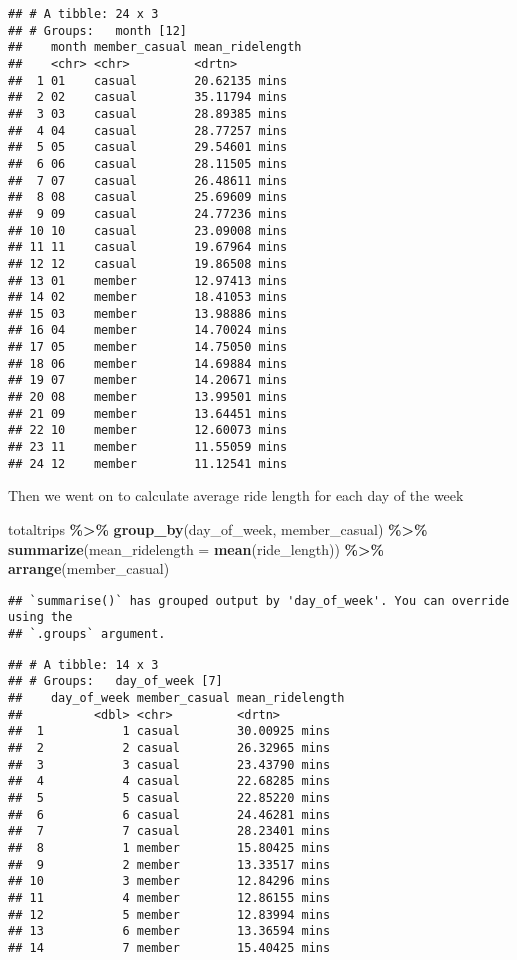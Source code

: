 \documentclass[
]{article}
\newenvironment{Shaded}{\begin{snugshade}}{\end{snugshade}}
\newcommand{\AttributeTok}[1]{\textcolor[rgb]{0.13,0.29,0.53}{#1}}
\newcommand{\FunctionTok}[1]{\textcolor[rgb]{0.13,0.29,0.53}{\textbf{#1}}}
\newcommand{\NormalTok}[1]{#1}
\newcommand{\SpecialCharTok}[1]{\textcolor[rgb]{0.81,0.36,0.00}{\textbf{#1}}}
\begin{document}
\begin{verbatim}
## # A tibble: 24 x 3
## # Groups:   month [12]
##    month member_casual mean_ridelength
##    <chr> <chr>         <drtn>         
##  1 01    casual        20.62135 mins  
##  2 02    casual        35.11794 mins  
##  3 03    casual        28.89385 mins  
##  4 04    casual        28.77257 mins  
##  5 05    casual        29.54601 mins  
##  6 06    casual        28.11505 mins  
##  7 07    casual        26.48611 mins  
##  8 08    casual        25.69609 mins  
##  9 09    casual        24.77236 mins  
## 10 10    casual        23.09008 mins  
## 11 11    casual        19.67964 mins  
## 12 12    casual        19.86508 mins  
## 13 01    member        12.97413 mins  
## 14 02    member        18.41053 mins  
## 15 03    member        13.98886 mins  
## 16 04    member        14.70024 mins  
## 17 05    member        14.75050 mins  
## 18 06    member        14.69884 mins  
## 19 07    member        14.20671 mins  
## 20 08    member        13.99501 mins  
## 21 09    member        13.64451 mins  
## 22 10    member        12.60073 mins  
## 23 11    member        11.55059 mins  
## 24 12    member        11.12541 mins
\end{verbatim}

Then we went on to calculate average ride length for each day of the
week

\begin{Shaded}
\begin{Highlighting}[]
\NormalTok{totaltrips }\SpecialCharTok{\%\textgreater{}\%} \FunctionTok{group\_by}\NormalTok{(day\_of\_week, member\_casual) }\SpecialCharTok{\%\textgreater{}\%} \FunctionTok{summarize}\NormalTok{(}\AttributeTok{mean\_ridelength =} \FunctionTok{mean}\NormalTok{(ride\_length)) }\SpecialCharTok{\%\textgreater{}\%} \FunctionTok{arrange}\NormalTok{(member\_casual)}
\end{Highlighting}
\end{Shaded}

\begin{verbatim}
## `summarise()` has grouped output by 'day_of_week'. You can override using the
## `.groups` argument.
\end{verbatim}

\begin{verbatim}
## # A tibble: 14 x 3
## # Groups:   day_of_week [7]
##    day_of_week member_casual mean_ridelength
##          <dbl> <chr>         <drtn>         
##  1           1 casual        30.00925 mins  
##  2           2 casual        26.32965 mins  
##  3           3 casual        23.43790 mins  
##  4           4 casual        22.68285 mins  
##  5           5 casual        22.85220 mins  
##  6           6 casual        24.46281 mins  
##  7           7 casual        28.23401 mins  
##  8           1 member        15.80425 mins  
##  9           2 member        13.33517 mins  
## 10           3 member        12.84296 mins  
## 11           4 member        12.86155 mins  
## 12           5 member        12.83994 mins  
## 13           6 member        13.36594 mins  
## 14           7 member        15.40425 mins
\end{verbatim}
\end{document}
